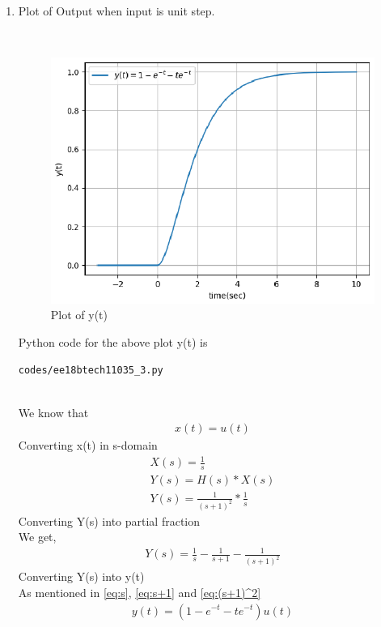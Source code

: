 \begin{enumerate}[label=\thesection.\arabic*.,ref=\thesection.\theenumi]
\item Plot of Output when input is unit step.

\\ \solution
\begin{figure}[!h]
\includegraphics[width=\columnwidth]{./figures/ee18btech11035_3.eps}
\caption{Plot of y(t)}
\label{fig:ee18btech11035_y(t)}
\end{figure}

Python code for the above plot y(t) is
\begin{lstlisting}
codes/ee18btech11035_3.py
\end{lstlisting}


\\
We know that
\begin{align}
x(t) = u(t)
\end{align}
Converting x(t) in s-domain 
\begin{align}
X(s) = \frac{1}{s}\\
Y(s) = H(s)*X(s)\\
Y(s) = \frac{1}{(s+1)^2}*\frac{1}{s}
\end{align}
Converting Y(s) into partial fraction\\
We get,
\begin{align}
Y(s) = \frac{1}{s}-\frac{1}{s+1}-\frac{1}{(s+1)^2}
\end{align}
Converting Y(s) into y(t)\\
As mentioned in \eqref{eq:s}, \eqref{eq:s+1} and \eqref{eq:(s+1)^2}\\
\begin{align}
y(t) = (1-e^{-t}-te^{-t})u(t)
\end{align}


\end{enumerate}